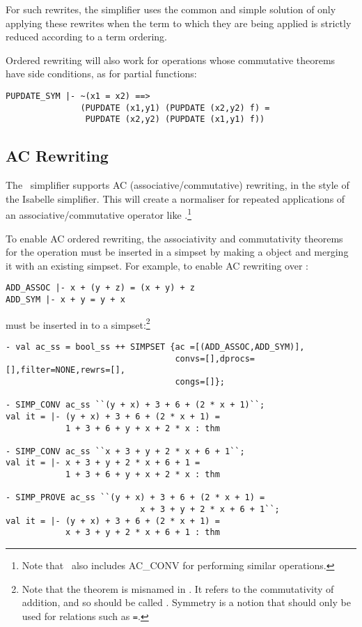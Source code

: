 For such rewrites, the simplifier uses the common and
simple solution of only applying these rewrites when the term
to which they are being applied is strictly reduced according to a term
ordering.

Ordered rewriting will also work for operations whose
commutative theorems have side conditions, as for partial functions:
\begin{hol} \begin{verbatim}
PUPDATE_SYM |- ~(x1 = x2) ==>
               (PUPDATE (x1,y1) (PUPDATE (x2,y2) f) =
                PUPDATE (x2,y2) (PUPDATE (x1,y1) f))
\end{verbatim} \end{hol}

\subsection{AC Rewriting}

The \HOL\ simplifier supports AC (associative/commutative) rewriting,
in the style of the Isabelle simplifier.  This will create a
normaliser for repeated applications of an associative/commutative
operator like \ml{+}.\footnote{Note that \HOL\ also includes AC\_CONV
for performing similar operations.}

To enable AC ordered rewriting, the associativity and commutativity theorems
for the operation must be inserted in a simpset by making a 
object and merging it with an existing simpset. For example, to enable
AC rewriting over \ml{+}: 
\begin{hol} \begin{verbatim}
ADD_ASSOC |- x + (y + z) = (x + y) + z
ADD_SYM |- x + y = y + x
\end{verbatim} \end{hol}
must be inserted in to a simpset:\footnote{Note that
the theorem  is misnamed in \HOL.  It refers
to the commutativity of addition, and so should be called
.
Symmetry is a notion that should only be used for relations such as
\verb!=!.} 
\begin{boxed} \begin{verbatim}
- val ac_ss = bool_ss ++ SIMPSET {ac =[(ADD_ASSOC,ADD_SYM)],
                                  convs=[],dprocs=[],filter=NONE,rewrs=[],
                                  congs=[]};

- SIMP_CONV ac_ss ``(y + x) + 3 + 6 + (2 * x + 1)``;
val it = |- (y + x) + 3 + 6 + (2 * x + 1) =
            1 + 3 + 6 + y + x + 2 * x : thm

- SIMP_CONV ac_ss ``x + 3 + y + 2 * x + 6 + 1``;
val it = |- x + 3 + y + 2 * x + 6 + 1 =
            1 + 3 + 6 + y + x + 2 * x : thm

- SIMP_PROVE ac_ss ``(y + x) + 3 + 6 + (2 * x + 1) =
                           x + 3 + y + 2 * x + 6 + 1``;
val it = |- (y + x) + 3 + 6 + (2 * x + 1) =
            x + 3 + y + 2 * x + 6 + 1 : thm
\end{verbatim} \end{boxed}



